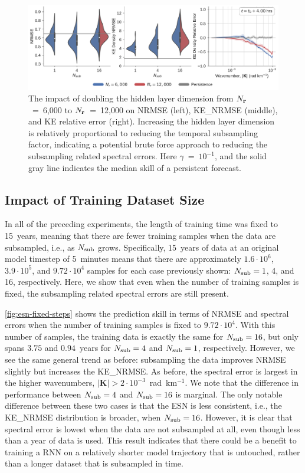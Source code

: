 \documentclass[draft]{agujournal2019}
\begin{document}
\begin{figure}
    \centering
    \includegraphics[width=\textwidth]{figures/rc_reservoir_size.pdf}
    \caption{The impact of doubling the hidden layer dimension from
        $N_{\mathbf{r}}$~=~6,000 to
        $N_{\mathbf{r}}$~=~12,000 on NRMSE (left), KE\_NRMSE (middle), and KE relative
        error (right).
        Increasing the hidden layer dimension is relatively proportional to reducing
        the temporal subsampling factor, indicating a potential brute force
        approach to reducing the subsampling related spectral errors.
        Here $\gamma$~=~$10^{-1}$, and the solid gray line indicates the
        median skill of a persistent forecast.
    }
    \label{fig:esn-size}
\end{figure}

\subsection{Impact of Training Dataset Size}
\label{subsec:esn-fixed-steps}

In all of the preceding experiments, the length of training time was fixed to
15~years, meaning that there are fewer training samples when the data are
subsampled, i.e., as $N_\text{sub}$ grows.
Specifically, 15~years of data at an original model timestep of 5~minutes means
that there are approximately
$1.6\cdot10^{6}$, $3.9\cdot10^5$, and $9.72\cdot10^4$ samples
for each case previously shown: $N_\text{sub}=1$, 4, and 16, respectively.
Here, we show that even when the number of training samples is fixed, the
subsampling related spectral errors are still present.

\cref{fig:esn-fixed-steps} shows the prediction skill in terms of NRMSE and
spectral errors when the number of training samples is fixed to $9.72\cdot10^4$.
With this number of samples, the training data is exactly the same for
$N_\text{sub}=16$, but only spans $3.75$ and $0.94$~years for $N_\text{sub}=4$ and $N_\text{sub}=1$,
respectively.
However, we see the same general trend as before: subsampling the data improves
NRMSE slightly but increases the KE\_NRMSE.
As before, the spectral error is largest in the higher wavenumbers,
$|\mathbf{K}| > 2\cdot10^{-3}$~rad~km$^{-1}$.
We note that the difference in performance between $N_\text{sub}=4$ and $N_\text{sub}=16$ is
marginal.
The only notable difference between these two cases is that the ESN is less
consistent, i.e., the KE\_NRMSE distribution is broader, when $N_\text{sub}=16$.
However, it is clear that spectral error is lowest when the data are not
subsampled at all, even though less than a year of data is used.
This result indicates that there could be a benefit to training a RNN on a
relatively shorter model trajectory that is untouched, rather than a longer
dataset that is subsampled in time.
\end{document}
